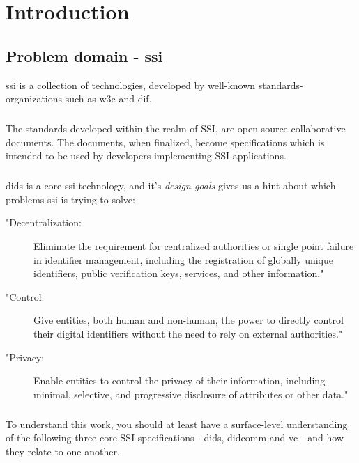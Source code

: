 \chapter{Introduction}



\section{Problem domain - \acrfull{ssi}}

\acrfull{ssi} is a collection of technologies, developed by well-known standards-organizations such as \acrfull{w3c} and \acrfull{dif}.

\paragraph{}
The standards developed within the realm of SSI, are open-source collaborative documents. The documents, when finalized, become specifications which is intended to be used by developers implementing SSI-applications. 

\paragraph{}
\acrfull{dids} is a core \acrshort{ssi}-technology, and it's \textit{design goals}\cite{DIDDesignGoals} gives us a hint about which problems \acrshort{ssi} is trying to solve:
\begin{description}
    \item["Decentralization:] Eliminate the requirement for centralized authorities or single point failure in identifier management, including the registration of globally unique identifiers, public verification keys, services, and other information."
    \item["Control:] Give entities, both human and non-human, the power to directly control their digital identifiers without the need to rely on external authorities."
    \item ["Privacy:] Enable entities to control the privacy of their information, including minimal, selective, and progressive disclosure of attributes or other data."
\end{description}

\paragraph{}
To understand this work, you should at least have a surface-level understanding of the following three core SSI-specifications - \acrfull{dids}, \acrfull{didcomm} and \acrfull{vc} - and how they relate to one another.

